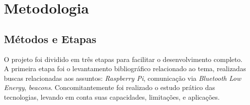 \documentclass[
		12pt,				%
		openright,			%
		oneside,			%
		a4paper,			%
		chapter=TITLE,		%
		english,			%
		brazil				%
	]{abntex2}
\begin{document}



\textual

















\chapter{Metodologia}\label{cap:metodologia}

\section{Métodos e Etapas}\label{sec:metodos-etapas}

O projeto foi dividido em três etapas para facilitar o desenvolvimento completo. A primeira etapa foi o levantamento bibliográfico relacionado ao tema, realizadas buscas relacionadas aos assuntos: \textit{Raspberry Pi}, comunicação via \textit{Bluetooth Low Energy}, \textit{beacons}. Concomitantemente foi realizado o estudo prático das tecnologias, levando em conta suas capacidades, limitações, e aplicações.
\end{document}
